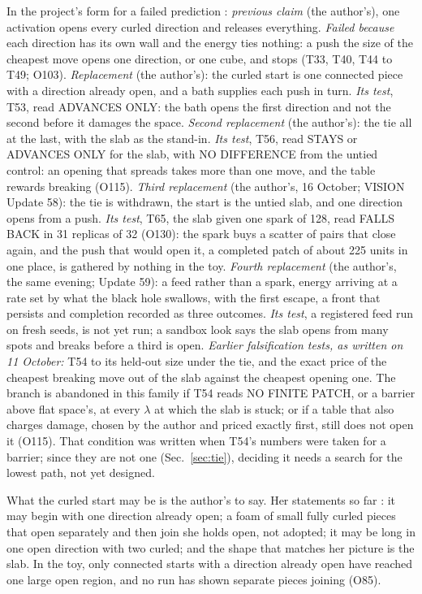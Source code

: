 \documentclass[aps,pre,10pt,twocolumn,superscriptaddress,nofootinbib]{revtex4-2}
\begin{document}
In the project's form for a failed prediction \cite{repo}: \emph{previous claim} (the author's), one activation
opens every curled direction and releases everything. \emph{Failed because} each direction has its own wall and the
energy ties nothing: a push the size of the cheapest move opens one direction, or one cube, and stops (T33, T40, T44
to T49; O103). \emph{Replacement} (the author's): the curled start is one connected piece with a direction already
open, and a bath supplies each push in turn. \emph{Its test}, T53, read ADVANCES ONLY: the bath opens the first
direction and not the second before it damages the space. \emph{Second replacement} (the author's): the tie all at
the last, with the slab as the stand-in. \emph{Its test}, T56, read STAYS or ADVANCES ONLY for the slab, with NO
DIFFERENCE from the untied control: an opening that spreads takes more than one move, and the table rewards
breaking (O115). \emph{Third replacement} (the author's, 16 October; VISION Update 58): the tie is withdrawn, the
start is the untied slab, and one direction opens from a push. \emph{Its test}, T65, the slab given one spark of 128,
read FALLS BACK in 31 replicas of 32 (O130): the spark buys a scatter of pairs that close again, and the push that
would open it, a completed patch of about 225 units in one place, is gathered by nothing in the toy.
\emph{Fourth replacement} (the author's, the same evening; Update 59): a feed rather than a spark, energy arriving at
a rate set by what the black hole swallows, with the first escape, a front that persists and completion recorded as
three outcomes. \emph{Its test}, a registered feed run on fresh seeds, is not yet run; a sandbox look says the slab
opens from many spots and breaks before a third is open. \emph{Earlier falsification tests, as written on 11 October:} T54 to its
held-out size under the tie, and the exact price of the cheapest breaking move out of the slab against the cheapest
opening one. The branch is abandoned in this family if T54 reads NO FINITE PATCH, or a barrier above flat space's,
at every $\lambda$ at which the slab is stuck; or if a table that also charges damage, chosen by the author and
priced exactly first, still does not open it (O115). That condition was written when T54's numbers were taken for a
barrier; since they are not one (Sec.~\ref{sec:tie}), deciding it needs a search for the lowest path, not yet
designed.

What the curled start may be is the author's to say. Her statements so far \cite{repo}: it may begin with one
direction already open; a foam of small fully curled pieces that open separately and then join she holds open,
not adopted; it may be long in one open direction with two curled; and the shape that matches her
picture is the slab. In the toy, only connected starts with a direction already open have reached one large open
region, and no run has shown separate pieces joining (O85).
\end{document}
